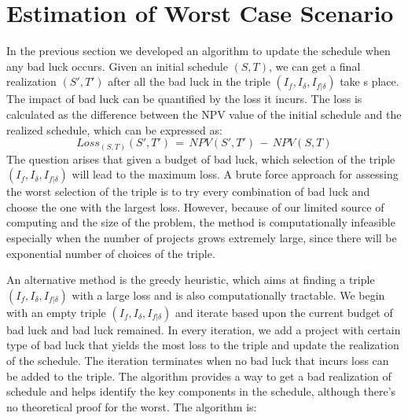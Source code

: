 \documentclass[final,3p,times]{elsarticle}
\begin{document}
\section{Estimation of Worst Case Scenario}
In the previous section we developed an algorithm to update the schedule when any bad luck occurs. Given an initial schedule $(S, T)$, we can get a final realization $(S', T')$ after all the bad luck in the triple $(I_f, I_{\delta}, I_{f|\delta})$  take s place.  The impact of bad luck can be quantified by the loss it incurs. The loss is calculated as the difference between the NPV value of the initial schedule and the realized schedule, which can be expressed as:
\begin{equation}
	Loss_{(S,T)}(S',T')\,=\, NPV(S',T')\,-\,NPV(S,T)
\end{equation}
The question arises that given a budget of bad luck, which selection of the triple $(I_f, I_{\delta}, I_{f|\delta})$  will lead to the maximum loss. A brute force approach for assessing the worst selection of the triple is to try every combination of bad luck and choose the one with the largest loss. However, because of our limited source of computing and the size of the problem, the method is computationally infeasible especially when the number of projects grows extremely large, since there will be exponential number of choices of the triple. 

An alternative method is the greedy heuristic, which  aims at finding a triple $(I_f, I_{\delta}, I_{f|\delta})$ with a large loss and is also computationally tractable. We begin with an empty triple  $(I_f, I_{\delta}, I_{f|\delta})$ and iterate based upon the current budget of bad luck and bad luck remained. In every iteration, we add a project with certain type of bad luck that yields the most loss to the triple and update the realization of the schedule. The iteration terminates when no bad luck that incurs loss can be added to the triple. The algorithm provides a way to get a bad realization of schedule and helps identify the key components in the schedule, although there's no theoretical proof for the worst. The algorithm is:
\linebreak
\begin{algorithm}[H]\label{EstimateWorst}
\end{algorithm} 
\end{document}
